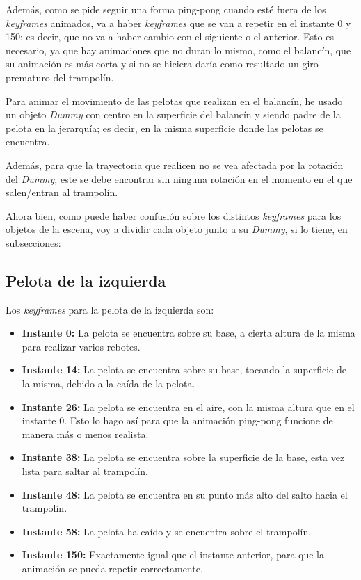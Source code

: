 \documentclass{article}
\begin{document}
Además, como se pide seguir una forma ping-pong cuando esté fuera de los \textit{keyframes} animados, va a haber \textit{keyframes} que se van a repetir en el instante 0 y 150; es decir, que no va a haber cambio con el siguiente o el anterior. Esto es necesario, ya que hay animaciones que no duran lo mismo, como el balancín, que su animación es más corta y si no se hiciera daría como resultado un giro prematuro del trampolín.

\bigskip

Para animar el movimiento de las pelotas que realizan en el balancín, he usado un objeto \textit{Dummy} con centro en la superficie del balancín y siendo padre de la pelota en la jerarquía; es decir, en la misma superficie donde las pelotas se encuentra.

Además, para que la trayectoria que realicen no se vea afectada por la rotación del \textit{Dummy}, este se debe encontrar sin ninguna rotación en el momento en el que salen/entran al trampolín.

\bigskip

Ahora bien, como puede haber confusión sobre los distintos \textit{keyframes} para los objetos de la escena, voy a dividir cada objeto junto a su \textit{Dummy}, si lo tiene, en subsecciones:

\subsection{Pelota de la izquierda}

Los \textit{keyframes} para la pelota de la izquierda son:

\begin{itemize}
    \item \textbf{Instante 0: }La pelota se encuentra sobre su base, a cierta altura de la misma para realizar varios rebotes.
    \item \textbf{Instante 14: }La pelota se encuentra sobre su base, tocando la superficie de la misma, debido a la caída de la pelota.
    \item \textbf{Instante 26: }La pelota se encuentra en el aire, con la misma altura que en el instante 0. Esto lo hago así para que la animación ping-pong funcione de manera más o menos realista.
    \item \textbf{Instante 38: }La pelota se encuentra sobre la superficie de la base, esta vez lista para saltar al trampolín.
    \item \textbf{Instante 48: }La pelota se encuentra en su punto más alto del salto hacia el trampolín.
    \item \textbf{Instante 58: }La pelota ha caído y se encuentra sobre el trampolín.
    \item \textbf{Instante 150: }Exactamente igual que el instante anterior, para que la animación se pueda repetir correctamente.
\end{itemize}
\end{document}
